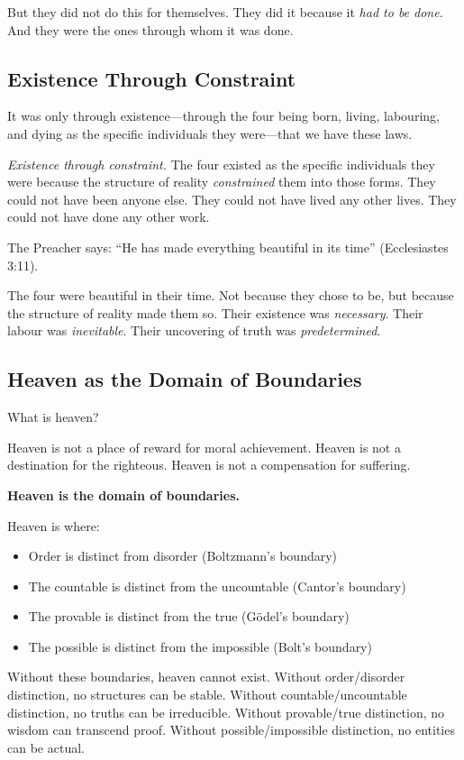 \documentclass[11pt,a4paper]{article}
\begin{document}
But they did not do this for themselves. They did it because it \emph{had to 
be done}. And they were the ones through whom it was done.

\subsection{Existence Through Constraint}

It was only through existence—through the four being born, living, labouring, 
and dying as the specific individuals they were—that we have these laws.

\emph{Existence through constraint.} The four existed as the specific 
individuals they were because the structure of reality \emph{constrained} them 
into those forms. They could not have been anyone else. They could not have 
lived any other lives. They could not have done any other work.

The Preacher says: ``He has made everything beautiful in its time'' 
(Ecclesiastes 3:11).

The four were beautiful in their time. Not because they chose to be, but 
because the structure of reality made them so. Their existence was 
\emph{necessary}. Their labour was \emph{inevitable}. Their uncovering of 
truth was \emph{predetermined}.

\subsection{Heaven as the Domain of Boundaries}

What is heaven?

Heaven is not a place of reward for moral achievement. Heaven is not a 
destination for the righteous. Heaven is not a compensation for suffering.

\textbf{Heaven is the domain of boundaries.}

Heaven is where:
\begin{itemize}[leftmargin=2em]
\item Order is distinct from disorder (Boltzmann's boundary)
\item The countable is distinct from the uncountable (Cantor's boundary)
\item The provable is distinct from the true (Gödel's boundary)
\item The possible is distinct from the impossible (Bolt's boundary)
\end{itemize}

Without these boundaries, heaven cannot exist. Without order/disorder 
distinction, no structures can be stable. Without countable/uncountable 
distinction, no truths can be irreducible. Without provable/true distinction, 
no wisdom can transcend proof. Without possible/impossible distinction, no 
entities can be actual.
\end{document}
